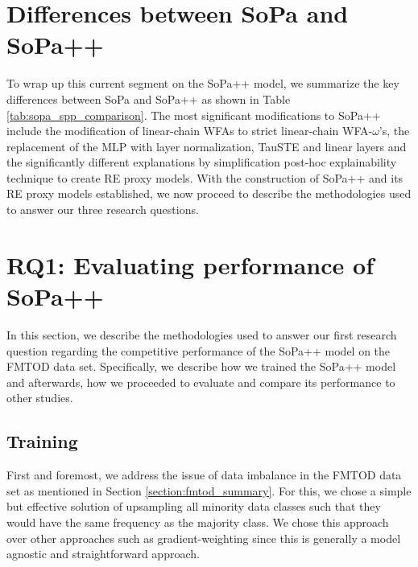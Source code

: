 \section{Differences between SoPa and SoPa++}

To wrap up this current segment on the SoPa++ model, we summarize the key
differences between SoPa and SoPa++ as shown in Table
\ref{tab:sopa_spp_comparison}. The most significant modifications to SoPa++
include the modification of linear-chain WFAs to strict linear-chain
WFA-$\omega$'s, the replacement of the MLP with layer normalization, TauSTE and
linear layers and the significantly different explanations by simplification
post-hoc explainability technique to create RE proxy models. With the
construction of SoPa++ and its RE proxy models established, we now proceed to
describe the methodologies used to answer our three research questions.

\section{RQ1: Evaluating performance of SoPa++}

In this section, we describe the methodologies used to answer our first research
question regarding the competitive performance of the SoPa++ model on the FMTOD
data set. Specifically, we describe how we trained the SoPa++ model and
afterwards, how we proceeded to evaluate and compare its performance to other
studies.

\subsection{Training}

\label{section:spp_training}

First and foremost, we address the issue of data imbalance in the FMTOD data set
as mentioned in Section \ref{section:fmtod_summary}. For this, we chose a simple
but effective solution of upsampling all minority data classes such that they
would have the same frequency as the majority class. We chose this approach over
other approaches such as gradient-weighting since this is generally a model
agnostic and straightforward approach.

